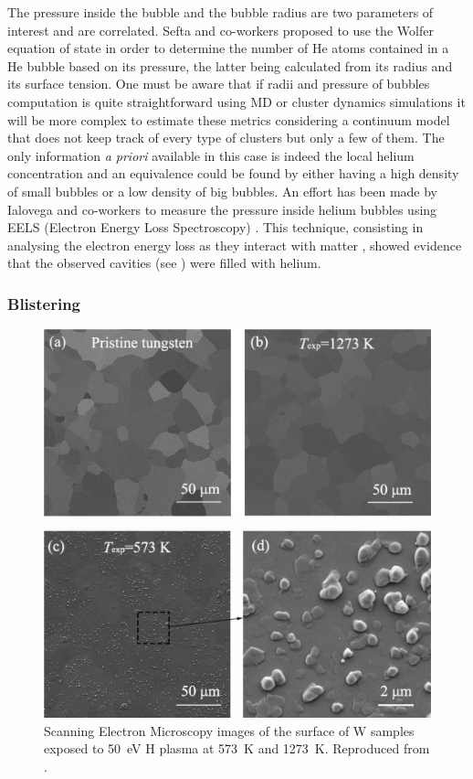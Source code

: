 The pressure inside the bubble and the bubble radius are two parameters of interest and are correlated.
Sefta and co-workers  proposed to use the Wolfer equation of state in order to determine the number of He atoms contained in a He bubble based on its pressure, the latter being calculated from its radius and its surface tension.
One must be aware that if radii and pressure of bubbles computation is quite straightforward using MD  or cluster dynamics  simulations it will be more complex to estimate these metrics considering a continuum model that does not keep track of every type of clusters but only a few of them.
The only information \textit{a priori} available in this case is indeed the local helium concentration and an equivalence could be found by either having a high density of small bubbles or a low density of big bubbles.
An effort has been made by Ialovega and co-workers to measure the pressure inside helium bubbles using EELS (Electron Energy Loss Spectroscopy) .
This technique, consisting in analysing the electron energy loss as they interact with matter , showed evidence that the observed cavities (see ) were filled with helium.

\subsubsection{Blistering}

\begin{figure}
    \centering
    \includegraphics[width=\linewidth]{Figures/Chapter1/h_blisters_in_tungsten.jpg}
    \caption{Scanning Electron Microscopy images of the surface of W samples exposed to \SI{50}{eV} H plasma at \SI{573}{K} and \SI{1273}{K}. Reproduced from \cite{chen_irradiation_2019}.}
\end{figure}

